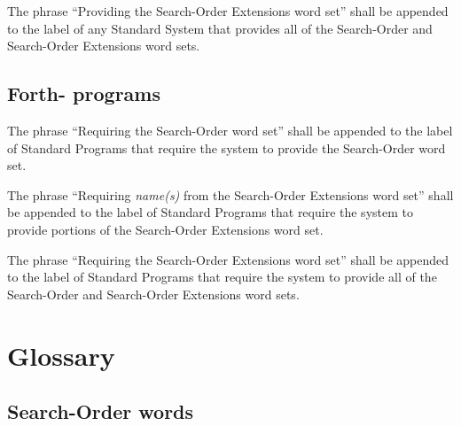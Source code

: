 The phrase ``Providing the Search-Order Extensions word set'' shall
be appended to the label of any Standard System that provides all of
the Search-Order and Search-Order Extensions word sets.

\subsection{Forth-\snapshot{} programs} %

The phrase ``Requiring the Search-Order word set'' shall be appended
to the label of Standard Programs that require the system to provide
the Search-Order word set.

The phrase ``Requiring \emph{name(s)} from the Search-Order
Extensions word set'' shall be appended to the label of Standard
Programs that require the system to provide portions of the
Search-Order Extensions word set.

The phrase ``Requiring the Search-Order Extensions word set'' shall
be appended to the label of Standard Programs that require the system
to provide all of the Search-Order and Search-Order Extensions word
sets.


\section{Glossary} %

\subsection{Search-Order words} %

